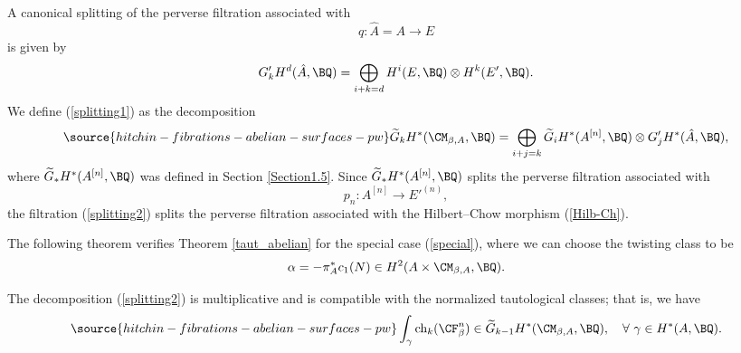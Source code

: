 A canonical splitting of the perverse filtration associated with
\[
q: \hat{A} =A \to E
\]
is given by
\[
G'_kH^d(\hat{A}, \BQ) = \bigoplus_{i+k =d} H^i(E, \BQ)\otimes H^k(E',\BQ).
\]
We define (\ref{splitting1}) as the decomposition
\begin{equation}\label{splitting2}
\source{hitchin-fibrations-abelian-surfaces-pw}
\widetilde{G}_kH^\ast(\CM_{\beta, A}, \BQ) = \bigoplus_{i+j=k}  \widetilde{G}_i H^\ast(A^{[n]}, \BQ) \otimes G'_jH^\ast(\hat{A},\BQ),
\end{equation}
where
$\widetilde{G}_\ast H^\ast(A^{[n]}, \BQ)$ was defined in Section \ref{Section1.5}.
Since $\widetilde{G}_\ast H^\ast(A^{[n]}, \BQ)$ splits the perverse filtration associated with
\[
p_n:  A^{[n]} \to E'^{(n)},
\]
the filtration (\ref{splitting2}) splits the perverse filtration associated with the Hilbert--Chow morphism (\ref{Hilb-Ch}).

The following theorem verifies Theorem \ref{taut_abelian} for the special case (\ref{special}), where we can choose the twisting class to be
\[
\alpha = - \pi_A^* c_1(N) \in H^2(A\times \CM_{\beta,A}, \BQ).
\]

\begin{thm}
\notready\label{Step1}
The decomposition (\ref{splitting2}) is multiplicative and is compatible with the normalized tautological classes; that is, we have
\begin{equation}\label{1}
\source{hitchin-fibrations-abelian-surfaces-pw}
\int_\gamma \mathrm{ch}_k(\CF^n_\beta) \in \widetilde{G}_{k-1} H^\ast(\CM_{\beta,A}, \BQ),\quad \forall~\gamma \in H^\ast(A, \BQ).
\end{equation}
\end{thm}

